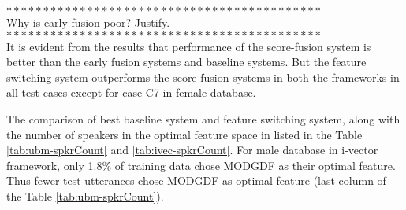 \documentclass{article}
\begin{document}
$******************************************* $ \\
Why is early fusion poor? Justify. \\
$*******************************************$ \\

It is evident from the results that performance of the score-fusion system is 
better than the early fusion systems and baseline systems. But the feature 
switching system outperforms the score-fusion systems in both the frameworks 
in all test cases except for case C7 in female database.

The comparison of best baseline system and feature switching system, along with
the number of speakers in the optimal feature space in listed in the Table
\ref{tab:ubm-spkrCount} and \ref{tab:ivec-spkrCount}. For male database in
i-vector framework, only 1.8\% of training data chose MODGDF as their optimal
feature. Thus fewer test utterances chose MODGDF as optimal feature (last column
of the Table \ref{tab:ubm-spkrCount}). 
\end{document}
